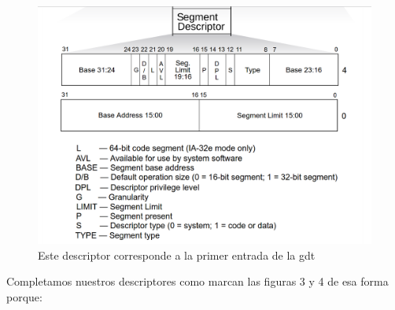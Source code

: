 \begin{figure}[H]
\begin{center}
  \includegraphics[width=\linewidth]{ejercicio1/estructuradescriptor.png}
  \caption{{\small Este descriptor corresponde a la primer entrada de la gdt}} 
\endminipage
\end{center}
\end{figure}

Completamos nuestros descriptores como marcan las figuras 3 y 4 de esa forma porque:


